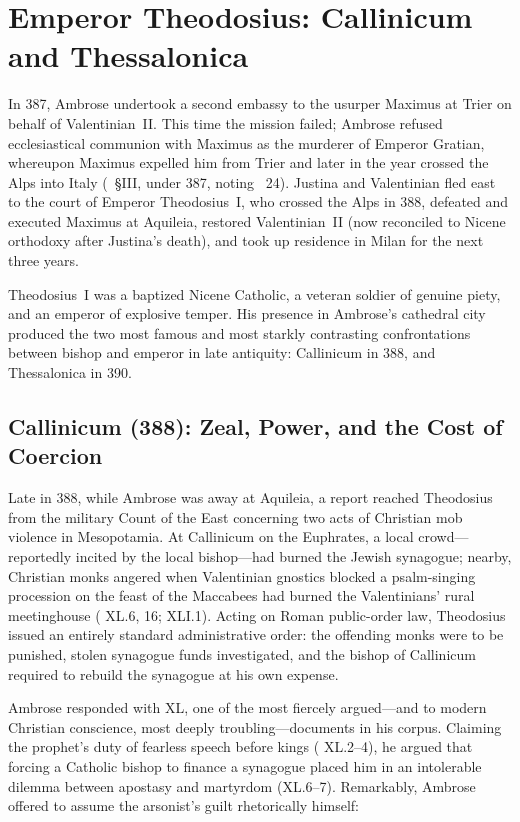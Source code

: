 \section{Emperor Theodosius: Callinicum and Thessalonica}

In 387, Ambrose undertook a second embassy to the usurper Maximus at Trier on behalf of Valentinian~II. This time the mission failed; Ambrose refused ecclesiastical communion with Maximus as the murderer of Emperor Gratian, whereupon Maximus expelled him from Trier and later in the year crossed the Alps into Italy (~\S III, under 387, noting ~24). Justina and Valentinian fled east to the court of Emperor Theodosius~I, who crossed the Alps in 388, defeated and executed Maximus at Aquileia, restored Valentinian~II (now reconciled to Nicene orthodoxy after Justina's death), and took up residence in Milan for the next three years.

Theodosius~I was a baptized Nicene Catholic, a veteran soldier of genuine piety, and an emperor of explosive temper. His presence in Ambrose's cathedral city produced the two most famous and most starkly contrasting confrontations between bishop and emperor in late antiquity: Callinicum in 388, and Thessalonica in 390.

\subsection{Callinicum (388): Zeal, Power, and the Cost of Coercion}

Late in 388, while Ambrose was away at Aquileia, a report reached Theodosius from the military Count of the East concerning two acts of Christian mob violence in Mesopotamia. At Callinicum on the Euphrates, a local crowd---reportedly incited by the local bishop---had burned the Jewish synagogue; nearby, Christian monks angered when Valentinian gnostics blocked a psalm-singing procession on the feast of the Maccabees had burned the Valentinians' rural meetinghouse ( XL.6, 16;  XLI.1). Acting on Roman public-order law, Theodosius issued an entirely standard administrative order: the offending monks were to be punished, stolen synagogue funds investigated, and the bishop of Callinicum required to rebuild the synagogue at his own expense.

Ambrose responded with  XL, one of the most fiercely argued---and to modern Christian conscience, most deeply troubling---documents in his corpus. Claiming the prophet's duty of fearless speech before kings ( XL.2--4), he argued that forcing a Catholic bishop to finance a synagogue placed him in an intolerable dilemma between apostasy and martyrdom (XL.6--7). Remarkably, Ambrose offered to assume the arsonist's guilt rhetorically himself:


